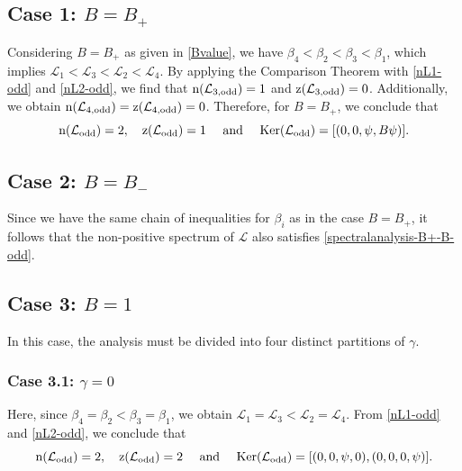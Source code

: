 \documentclass[10pt,reqno,a4paper]{amsart} %
\theoremstyle{definition} %
\numberwithin{equation}{section}
\numberwithin{figure}{section}
\begin{document}
\subsection*{Case 1: $B = B_+$} 
Considering $B = B_+$ as given in \eqref{Bvalue}, we have $\beta_4 < \beta_2 < \beta_3 < \beta_1$, which implies $\mathcal{L}_1 < \mathcal{L}_3 < \mathcal{L}_2 < \mathcal{L}_4$. By applying the Comparison Theorem with \eqref{nL1-odd} and \eqref{nL2-odd}, we find that ${\rm n}(\mathcal{L}_{3,\rm odd}) = 1$ and ${\rm z}(\mathcal{L}_{3,\rm odd}) = 0$. Additionally, we obtain ${\rm n}(\mathcal{L}_{4,\rm odd}) = {\rm z}(\mathcal{L}_{4,\rm odd}) = 0$. Therefore, for $B = B_+$, we conclude that 
\begin{equation}\label{spectralanalysis-B+-B-odd}
    {\rm n}(\mathcal{L}_{\rm odd}) = 2, \quad {\rm z}(\mathcal{L}_{\rm odd}) = 1 \quad \text{ and } \quad {\rm Ker}(\mathcal{L}_{\rm odd}) = [(0,0,\psi,B\psi)].
\end{equation}

\subsection*{Case 2: $B = B_-$} 
Since we have the same chain of inequalities for $\beta_i$ as in the case $B = B_+$, it follows that the non-positive spectrum of $\mathcal{L}$ also satisfies \eqref{spectralanalysis-B+-B-odd}.

\subsection*{Case 3: $B = 1$} 
In this case, the analysis must be divided into four distinct partitions of $\gamma$. 

\subsubsection*{Case 3.1: $\gamma = 0$} 
Here, since $\beta_4 = \beta_2 < \beta_3 = \beta_1$, we obtain $\mathcal{L}_1 = \mathcal{L}_3 < \mathcal{L}_2 = \mathcal{L}_4$. From \eqref{nL1-odd} and \eqref{nL2-odd}, we conclude that
\begin{equation*}%
    {\rm n}(\mathcal{L}_{\rm odd}) = 2, \quad {\rm z}(\mathcal{L}_{\rm odd}) = 2 \quad \text{ and } \quad {\rm Ker}(\mathcal{L}_{\rm odd}) = [(0,0,\psi,0), (0,0,0,\psi)].
\end{equation*}
\end{document}
